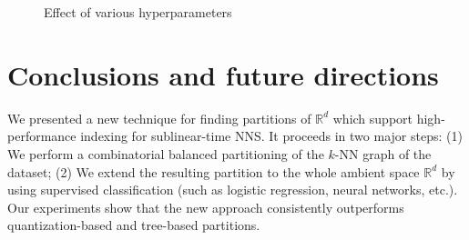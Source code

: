 \documentclass[11pt]{article}
\begin{document}
\begin{figure}%
    \centering
    \caption{Effect of various hyperparameters}
    \label{piotr_fig:hyper_plots}
\end{figure}




\section{Conclusions and future directions}

We presented a new technique for finding partitions of $\mathbb{R}^d$ which support high-performance indexing for sublinear-time NNS.
It proceeds in two major steps:
%
(1) We perform a combinatorial balanced partitioning of the $k$-NN graph of the dataset;
(2) We extend the resulting partition to the whole ambient space $\mathbb{R}^d$ by using
    supervised classification (such as logistic regression, neural networks, etc.).
Our experiments show that the new approach consistently outperforms quantization-based and tree-based
partitions.
\end{document}
